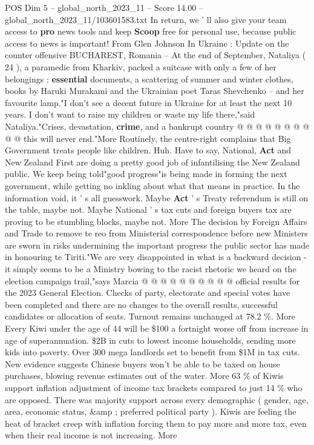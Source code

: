 \begin{textsample}{POS Dim 5 – global\_north\_2023\_11 – Score 14.00 – global\_north\_2023\_11/103601583.txt}
In return, we ' ll also give your team access to \textbf{pro} news tools and keep \textbf{Scoop} free for personal use, because public access to news is important!
From Glen Johnson In Ukraine : Update on the counter offensive BUCHAREST, Romania -- At the end of September, Nataliya ( 24 ), a paramedic from Kharkiv, packed a suitcase with only a few of her belongings : \textbf{essential} documents, a scattering of summer and winter clothes, books by Haruki Murakami and the Ukrainian poet Taras Shevchenko -- and her favourite lamp."I don't see a decent future in Ukraine for at least the next 10 years.
I don't want to raise my children or waste my life there,"said Nataliya."Crises, devastation, \textbf{crime}, and a bankrupt country @ @ @ @ @ @ @ @ @ @ this will never end."More Routinely, the centre-right complains that Big Government treats people like children.
Huh.
Have to say, National, \textbf{Act} and New Zealand First are doing a pretty good job of infantilising the New Zealand public.
We keep being told"good progress"is being made in forming the next government, while getting no inkling about what that means in practice.
In the information void, it ' s all guesswork.
Maybe \textbf{Act} ' s Treaty referendum is still on the table, maybe not.
Maybe National ' s tax cuts and foreign buyers tax are proving to be stumbling blocks, maybe not.
More The decision by Foreign Affairs and Trade to remove te reo from Ministerial correspondence before new Ministers are sworn in risks undermining the important progress the public sector has made in honouring te Tiriti."We are very disappointed in what is a backward decision - it simply seems to be a Ministry bowing to the racist rhetoric we heard on the election campaign trail,"says Marcia @ @ @ @ @ @ @ @ @ @ official results for the 2023 General Election.
Checks of party, electorate and special votes have been completed and there are no changes to the overall results, successful candidates or allocation of seats.
Turnout remains unchanged at 78.2 \%.
More Every Kiwi under the age of 44 will be \$100 a fortnight worse off from increase in age of superannuation. \$2B in cuts to lowest income households, sending more kids into poverty.
Over 300 mega landlords set to benefit from \$1M in tax cuts.
New evidence suggests Chinese buyers won't be able to be taxed on house purchases, blowing revenue estimates out of the water.
More 63 \% of Kiwis support inflation adjustment of income tax brackets compared to just 14 \% who are opposed.
There was majority support across every demographic ( gender, age, area, economic status, \&amp ; preferred political party ).
Kiwis are feeling the heat of bracket creep with inflation forcing them to pay more and more tax, even when their real income is not increasing.
More

\end{textsample}
